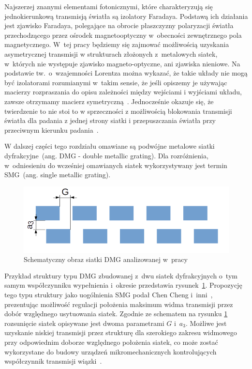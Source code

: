 Najszerzej znanymi elementami fotonicznymi, które charakteryzują się jednokierunkową transmisją światła są izolatory Faradaya.  Podstawą ich działania jest zjawisko Faradaya, polegające na obrocie płaszczyzny polaryzacji światła przechodzącego przez ośrodek magnetooptyczny w~obecności zewnętrznego pola magnetycznego. W~tej pracy będziemy się zajmować możliwością uzyskania asymetrycznej transmisji w strukturach złożonych z~metalowych siatek, w~których nie występuje zjawisko magneto-optyczne, ani zjawiska nieniowe. Na podstawie tw.~o~wzajemności Lorentza można wykazać, że takie układy nie mogą być izolatorami rozumianymi w~takim sensie, że jeśli opiszemy je używając macierzy rozpraszania do opisu zależności między wejściami i wyjściami układu, zawsze otrzymamy macierz symetryczną~\cite{4171512}. Jednocześnie okazuje się, że twierdzenie to nie stoi to w sprzeczności z możliwością blokowania transmisji światła dla padania z jednej strony siatki i przepuszczania światła przy przeciwnym kierunku padania~\cite{lockyear2006one}.

W dalszej części tego rozdziału omawiane są podwójne metalowe siatki dyfrakcyjne~(ang. DMG - double metallic grating). Dla rozróżnienia, w~odniesieniu do wcześniej omawianych siatek wykorzystywany jest termin SMG~(ang. single metallic grating).

\begin{figure}[tb]
	\includegraphics[width=\textwidth]{images/dmg/dmg_general_schem.png}
	\caption{Schematyczny obraz siatki DMG analizowanej w~pracy~\cite{cheng2007controllable}}
	\label{fig:cheng_dmg_schem}
\end{figure}

Przykład struktury typu DMG zbudowanej z~dwu siatek dyfrakcyjnych o~tym samym współczynniku wypełnienia i~okresie przedstawia rysunek~\ref{fig:cheng_dmg_schem}. Propozycję tego typu struktury jako uogólnienia SMG podał Chen Cheng i~inni~\cite{cheng2007controllable}, prezentując możliwość regulacji położenia maksimum widma transmisji przez dobór względnego usytuowania siatek. Zgodnie ze schematem na rysunku \ref{fig:cheng_dmg_schem} rozsunięcie siatek opisywane jest dwoma parametrami $G$ i~$a_3$. Możliwe jest uzyskanie niskiej transmisji przez strukturę dla szerokiego zakresu widmowego przy odpowiednim doborze względnego położenia siatek, co może zostać wykorzystane do budowy urządzeń mikromechanicznych kontrolujących współczynnik transmisji wiązki~\cite{cheng2007controllable}.


